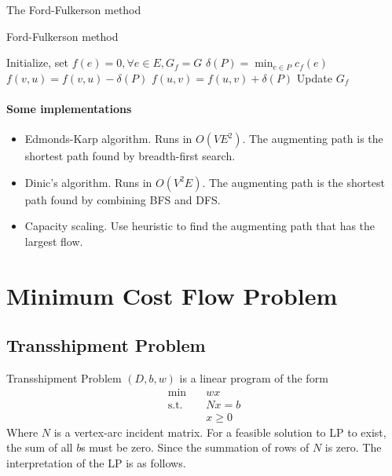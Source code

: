                 The Ford-Fulkerson method

                \begin{algorithm}
                    \centering
                    \caption{Ford-Fulkerson method}
                    \begin{algorithmic}
                        \State Initialize, set $f(e) = 0, \forall e \in E, G_f = G$
                            \State $\delta(P) = \min_{e \in P} c_f(e)$
                                    \State $f(v, u) = f(v, u) - \delta(P)$
                                \Else
                                    \State $f(u, v) = f(u, v) + \delta(P)$
                                \EndIf
                            \EndFor
                            \State Update $G_f$
                        \EndWhile
                    \end{algorithmic}
                \end{algorithm}

            \paragraph{Some implementations}
                \begin{itemize}
                    \item Edmonds-Karp algorithm. Runs in $O(VE^2)$. The augmenting path is the shortest path found by breadth-first search.
                    \item Dinic's algorithm. Runs in $O(V^2E)$. The augmenting path is the shortest path found by combining BFS and DFS.
                    \item Capacity scaling. Use heuristic to find the augmenting path that has the largest flow.
                \end{itemize}

    \section{Minimum Cost Flow Problem}
        \subsection{Transshipment Problem}
            Transshipment Problem $(D, b, w)$ is a linear program of the form
            \begin{align*}
                \min \quad & wx\\
                \text{s.t.} \quad & Nx = b\\
                                  & x \ge 0
            \end{align*}
            Where $N$ is a vertex-arc incident matrix. For a feasible solution to LP to exist, the sum of all $b$s must be zero. Since the summation of rows of $N$ is zero. The interpretation of the LP is as follows.


